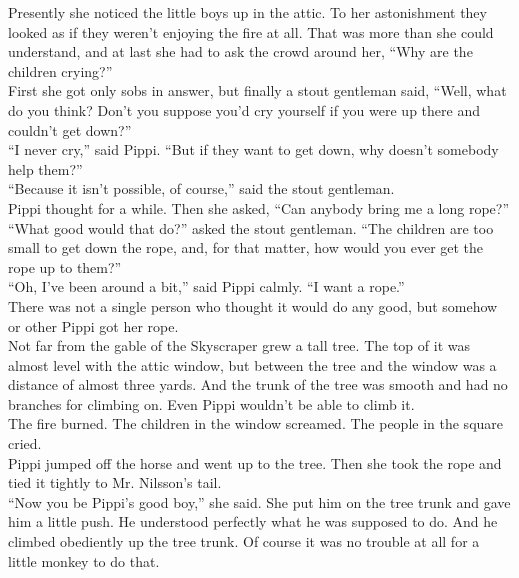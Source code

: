 \documentclass{standard}
\begin{document}
Presently she noticed the little boys up in the attic. To her astonishment they looked as if they weren’t enjoying the fire at all. That was more than she could understand, and at last she had to ask the crowd around her, “Why are the children crying?”\\

First she got only sobs in answer, but finally a stout gentleman said, “Well, what do you think? Don’t you suppose you’d cry yourself if you were up there and couldn’t get down?”\\

“I never cry,” said Pippi. “But if they want to get down, why doesn’t somebody help them?”\\

“Because it isn’t possible, of course,” said the stout gentleman.\\

Pippi thought for a while. Then she asked, “Can anybody bring me a long rope?”\\

“What good would that do?” asked the stout gentleman. “The children are too small to get down the rope, and, for that matter, how would you ever get the rope up to them?”\\

“Oh, I’ve been around a bit,” said Pippi calmly. “I want a rope.”\\

There was not a single person who thought it would do any good, but somehow or other Pippi got her rope.\\

Not far from the gable of the Skyscraper grew a tall tree. The top of it was almost level with the attic window, but between the tree and the window was a distance of almost three yards. And the trunk of the tree was smooth and had no branches for climbing on. Even Pippi wouldn’t be able to climb it.\\

The fire burned. The children in the window screamed. The people in the square cried.\\

Pippi jumped off the horse and went up to the tree. Then she took the rope and tied it tightly to Mr. Nilsson’s tail.\\

“Now you be Pippi’s good boy,” she said. She put him on the tree trunk and gave him a little push. He understood perfectly what he was supposed to do. And he climbed obediently up the tree trunk. Of course it was no trouble at all for a little monkey to do that.\\
\end{document}
